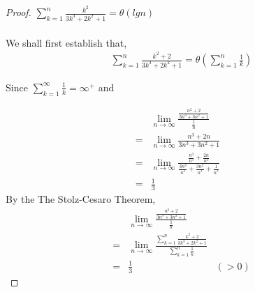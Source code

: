 \documentclass[12pt]{article}
\newenvironment{question}[2][Question]{\begin{trivlist}
\item[\hskip \labelsep {\bfseries #1}\hskip \labelsep {\bfseries #2.}]}{\end{trivlist}}
\begin{document}
\begin{question}{4}
  \begin{proof} $\sum_{k=1}^{n}\frac{k^{2}}{3k^{3} + 2k^{2} + 1} = \theta(lgn)$
    \leavevmode \\ \\
    We shall first establish that,
    \begin{align*}
      \sum_{k=1}^{n}\frac{k^{2} + 2}{3k^{3} + 2k^{2} + 1} = \theta(\sum_{k=1}^{n}\frac{1}{k})
    \end{align*}

    Since $\sum_{k=1}^{\infty} \frac{1}{k} = \infty^{+}$ and

    \begin{align*}
      & \lim_{n\to\infty} \frac{
        \frac{n^{2} + 2}{3n^{3} + 3n^{2} + 1}
      }{
        \frac{1}{n}
      } &\\
        = & \lim_{n\to\infty} \frac{n^{3} + 2n}{3n^{3} + 3n^{2} + 1} &\\
        = & \lim_{n\to\infty} \frac{
              \frac{n^{3}}{n^{3}} + \frac{2n}{n^{3}}
            }{
              \frac{3n^{3}}{n^{3}} + \frac{3n^{2}}{n^{3}} + \frac{1}{n^{3}}
            } &\\
        = & \frac{1}{3}
    \end{align*}
    By the The Stolz-Cesaro Theorem,
    \begin{align*}
      & \lim_{n\to\infty} \frac{
        \frac{n^{2} + 2}{3n^{3} + 3n^{2} + 1}
      }{
        \frac{1}{n}
      } &\\
      = & \lim_{n\to\infty} \frac{
        \sum_{k=1}^{n} \frac{k^{2} + 2}{3k^{3} + 2k^{2} + 1}
      }{
        \sum_{k=1}^{n} \frac{1}{k}
      } &\\
        = & \frac{1}{3} & (> 0)
    \end{align*}


\end{proof}
\end{question}
\end{document}
